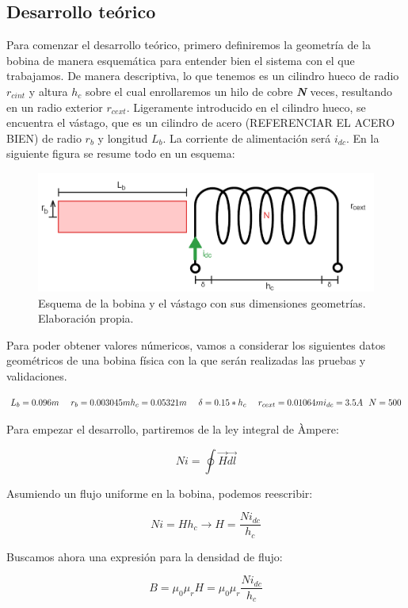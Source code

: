 \subsection{Desarrollo teórico}
Para comenzar el desarrollo teórico, primero definiremos la geometría de la bobina de manera esquemática para entender bien el sistema con el que trabajamos. De manera descriptiva, lo que tenemos es un cilindro hueco de radio \( r_{cint} \) y altura \( h_c \) sobre el cual enrollaremos un hilo de cobre \textbf{\textit{N}} veces, resultando en un radio exterior \( r_{cext} \). Ligeramente introducido en el cilindro hueco, se encuentra el vástago, que es un cilindro de acero (REFERENCIAR EL ACERO BIEN) de radio \( r_b \) y longitud \( L_b \). La corriente de alimentación será \( i_{dc} \). En la siguiente figura se resume todo en un esquema:

\begin{figure}[h]
    \centering
    \includegraphics[width=\linewidth]{FigurasMemoria/fig1esquemaGeom.png}
    \caption{Esquema de la bobina y el vástago con sus dimensiones geometrías. Elaboración propia.}
    \label{fig:1} %
\end{figure}

Para poder obtener valores númericos, vamos a considerar los siguientes datos geométricos de una bobina física con la que serán realizadas las pruebas y validaciones.

\[
L_b=0.096m~~~~r_b=0.003045m
\\~\\
h_c=0.05321m~~~~\delta=0.15*h_c~~~~r_{cext}=0.01064m
\\~\\
i_{dc}=3.5A~~N=500
\]

Para empezar el desarrollo, partiremos de la ley integral de Àmpere:

\[
Ni=\oint{\vec{H}\vec{dl}}
\]

Asumiendo un flujo uniforme en la bobina, podemos reescribir:

\[
Ni=Hh_c\to H=\frac{Ni_{dc}}{h_c}
\]

Buscamos ahora una expresión para la densidad de flujo:

\[
B=\mu_0\mu_r H=\mu_0\mu_r\frac{Ni_{dc}}{h_c}
\]